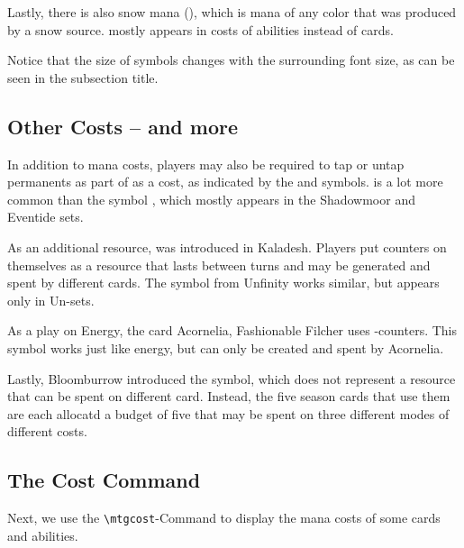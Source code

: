 \documentclass[a4paper]{scrartcl}
\begin{document}
	Lastly, there is also snow mana (\mtgS), which is mana of any color that was produced by a snow source.
	\mtgSnow{} mostly appears in costs of abilities instead of cards.

	Notice that the size of symbols changes with the surrounding font size, as can be seen in the subsection title.

	\subsection*{Other Costs -- \mtgP{} and more}

	In addition to mana costs, players may also be required to tap or untap permanents as part of as a cost, as indicated by the \mtgTap{} and \mtgUntap{} symbols.
	\mtgT{} is a lot more common than the symbol \mtgQ, which mostly appears in the Shadowmoor and Eventide sets.

	As an additional resource, \mtgEnergy{} was introduced in Kaladesh.
	Players put \mtgE{} counters on themselves as a resource that lasts between turns and may be generated and spent by different cards.
	The \mtgTicket{} symbol from Unfinity works similar, but appears only in Un-sets.

	As a play on Energy, the card Acornelia, Fashionable Filcher uses \mtgA-counters.
	This \mtgAcorn{} symbol works just like energy, but can only be created and spent by Acornelia.

	Lastly, Bloomburrow introduced the \mtgP{} symbol, which does not represent a resource that can be spent on different card.
	Instead, the five season cards that use them are each allocatd a budget of five \mtgPawprint{} that may be spent on three different modes of different costs.

	\subsection*{The Cost Command}

	Next, we use the \texttt{\textbackslash mtgcost}-Command to display the mana costs of some cards and abilities.
\end{document}
